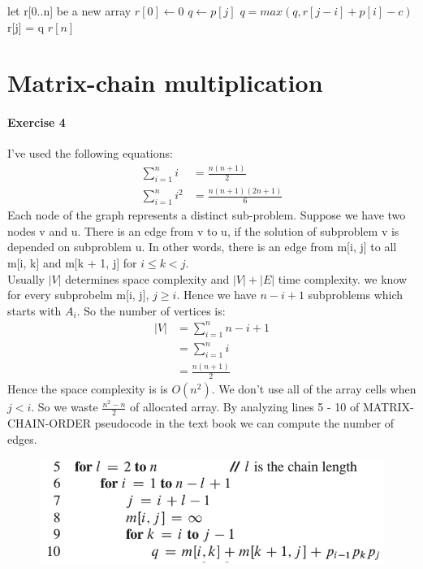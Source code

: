 \documentclass{book}
\begin{document}
	\begin{algorithm}
		\begin{algorithmic}[1]
			\State let r[0..n] be a new array
			\State $r[0] \gets 0$
			\State $q \gets p[j]$
			\State $q = max(q, r[j - i] + p[i] - c)$
			\EndFor
			\State r[j] = q
			\EndFor
			\State \Return $r[n]$
			\EndFunction
		\end{algorithmic}
	\end{algorithm}
	\section{Matrix-chain multiplication}
	\paragraph{Exercise 4}
	I've used the following equations:
	\begin{align}
	\sum_{i = 1}^{n} i &= \frac{n(n + 1)}{2}\\
	\sum_{i = 1}^{n} i^2 &= \frac{n(n + 1)(2n + 1)}{6}
	\end{align}
	Each node of the graph represents a distinct sub-problem. Suppose we have two nodes v and u. There is an edge from v to u, if the solution of subproblem v is depended on subproblem u. In other words, there is an edge from m[i, j] to all m[i, k] and m[k + 1, j] for $i \le k < j$. \\
	Usually $|V|$ determines space complexity and $|V| + |E|$ time complexity. we know for every subprobelm m[i, j], $j \ge i$. Hence we have $n - i + 1$ subproblems which starts with $A_i$. So the number of vertices is:
	\begin{equation}
	\begin{split}
	|V| &= \sum_{i = 1}^{n}{n - i + 1} \\
	&= \sum_{i=1}^{n}i \\
	&= \frac{n(n + 1)}{2}
	\end{split}
	\end{equation}
	Hence the space complexity is is $O(n^2)$. We don't use all of the array cells when $j < i$. So we waste $\frac{n^2 - n}{2}$ of allocated array. By analyzing lines 5 - 10 of MATRIX-CHAIN-ORDER pseudocode in the text book we can compute the number of edges.
	\begin{figure}[h!]
	\includegraphics[width=\linewidth]{images/15/15-2-4.png}
	\end{figure}
\end{document}

